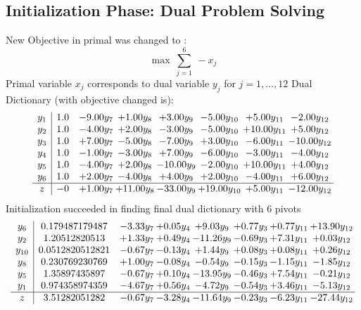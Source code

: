 \documentclass[8pt]{article}
\begin{document}
\subsection{Initialization Phase: Dual Problem Solving}
New Objective in primal was changed to : \[ \max\ \sum_{j=1}^{6}\ - x_j \] 
Primal variable $x_j$ corresponds to dual variable $y_j$ for $j = 1,\ldots,12$
Dual Dictionary (with objective changed is): 
\[\begin{array}{c| c c@{\hskip 2pt} c@{\hskip 2pt} c@{\hskip 2pt} c@{\hskip 2pt} c@{\hskip 2pt} c@{\hskip 2pt} }
 y_{1}   &  1.0 & -9.00 y_{7} & +  1.00 y_{8} & +  3.00 y_{9} & -5.00 y_{10} & +  5.00 y_{11} & -2.00 y_{12}\\
 y_{2}   &  1.0 & -4.00 y_{7} & +  2.00 y_{8} & -3.00 y_{9} & -5.00 y_{10} & + 10.00 y_{11} & +  5.00 y_{12}\\
 y_{3}   &  1.0 & +  7.00 y_{7} & -5.00 y_{8} & -7.00 y_{9} & +  3.00 y_{10} & -6.00 y_{11} & -10.00 y_{12}\\
 y_{4}   &  1.0 & -1.00 y_{7} & -3.00 y_{8} & +  7.00 y_{9} & -6.00 y_{10} & -3.00 y_{11} & -4.00 y_{12}\\
 y_{5}   &  1.0 & -4.00 y_{7} & +  2.00 y_{8} & -10.00 y_{9} & -2.00 y_{10} & + 10.00 y_{11} & +  4.00 y_{12}\\
 y_{6}   &  1.0 & +  2.00 y_{7} & -4.00 y_{8} & +  4.00 y_{9} & +  2.00 y_{10} & -4.00 y_{11} & +  6.00 y_{12}\\
\hline
z    &  -0 & +  1.00 y_{7} & + 11.00 y_{8} & -33.00 y_{9} & + 19.00 y_{10} & +  5.00 y_{11} & -12.00 y_{12}\\
\end{array}\]
Initialization succeeded in finding final dual dictionary with 6 pivots
\[\begin{array}{c| c c@{\hskip 2pt} c@{\hskip 2pt} c@{\hskip 2pt} c@{\hskip 2pt} c@{\hskip 2pt} c@{\hskip 2pt} }
 y_{6}   &  0.179487179487 & -3.33 y_{7} & +  0.05 y_{4} & +  9.03 y_{9} & +  0.77 y_{3} & +  0.77 y_{11} & + 13.90 y_{12}\\
 y_{2}   &  1.20512820513 & +  1.33 y_{7} & +  0.49 y_{4} & -11.26 y_{9} & -0.69 y_{3} & +  7.31 y_{11} & +  0.03 y_{12}\\
 y_{10}   &  0.0512820512821 & -0.67 y_{7} & -0.13 y_{4} & +  1.44 y_{9} & +  0.08 y_{3} & +  0.08 y_{11} & +  0.26 y_{12}\\
 y_{8}   &  0.230769230769 & +  1.00 y_{7} & -0.08 y_{4} & -0.54 y_{9} & -0.15 y_{3} & -1.15 y_{11} & -1.85 y_{12}\\
 y_{5}   &  1.35897435897 & -0.67 y_{7} & +  0.10 y_{4} & -13.95 y_{9} & -0.46 y_{3} & +  7.54 y_{11} & -0.21 y_{12}\\
 y_{1}   &  0.974358974359 & -4.67 y_{7} & +  0.56 y_{4} & -4.72 y_{9} & -0.54 y_{3} & +  3.46 y_{11} & -5.13 y_{12}\\
\hline
z    &  3.51282051282 & -0.67 y_{7} & -3.28 y_{4} & -11.64 y_{9} & -0.23 y_{3} & -6.23 y_{11} & -27.44 y_{12}\\
\end{array}\]
\end{document}

